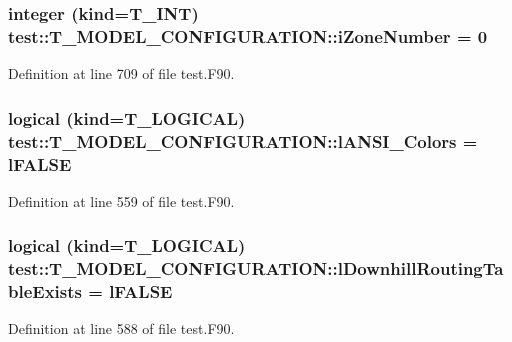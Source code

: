 \hypertarget{typetest_1_1_t___m_o_d_e_l___c_o_n_f_i_g_u_r_a_t_i_o_n_a17d7217143b32c1c33298c06c9eeef3a}{
\subsubsection[{iZoneNumber}]{\setlength{\rightskip}{0pt plus 5cm}integer (kind={\bf T\_\-INT}) {\bf test::T\_\-MODEL\_\-CONFIGURATION::iZoneNumber} = 0}}
\label{typetest_1_1_t___m_o_d_e_l___c_o_n_f_i_g_u_r_a_t_i_o_n_a17d7217143b32c1c33298c06c9eeef3a}


Definition at line 709 of file test.F90.

\hypertarget{typetest_1_1_t___m_o_d_e_l___c_o_n_f_i_g_u_r_a_t_i_o_n_a42c58ecbef54f15f365802f492c96925}{
\subsubsection[{lANSI\_\-Colors}]{\setlength{\rightskip}{0pt plus 5cm}logical (kind={\bf T\_\-LOGICAL}) {\bf test::T\_\-MODEL\_\-CONFIGURATION::lANSI\_\-Colors} = {\bf lFALSE}}}
\label{typetest_1_1_t___m_o_d_e_l___c_o_n_f_i_g_u_r_a_t_i_o_n_a42c58ecbef54f15f365802f492c96925}


Definition at line 559 of file test.F90.

\hypertarget{typetest_1_1_t___m_o_d_e_l___c_o_n_f_i_g_u_r_a_t_i_o_n_ae5d1fe2554515bae02751a3c4cfdc691}{
\subsubsection[{lDownhillRoutingTableExists}]{\setlength{\rightskip}{0pt plus 5cm}logical (kind={\bf T\_\-LOGICAL}) {\bf test::T\_\-MODEL\_\-CONFIGURATION::lDownhillRoutingTableExists} = {\bf lFALSE}}}
\label{typetest_1_1_t___m_o_d_e_l___c_o_n_f_i_g_u_r_a_t_i_o_n_ae5d1fe2554515bae02751a3c4cfdc691}


Definition at line 588 of file test.F90.

